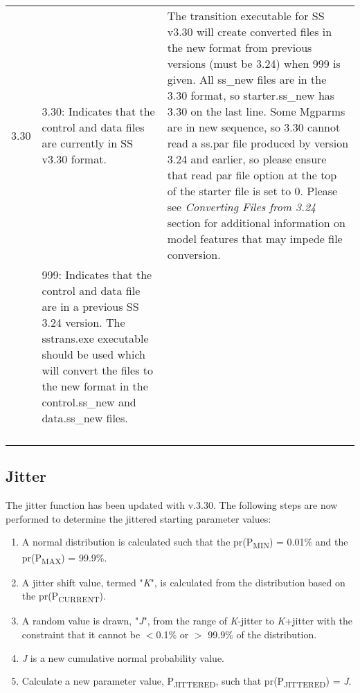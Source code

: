 {\begin{landscape}
\begin{longtable}{p{1.5cm} p{7cm} p{12.5cm}}
 
 \hline
 \hypertarget{Convert}{3.30} & 3.30: Indicates that the control and data files are currently in SS v3.30 format. 
	 & \multirow{1}{1cm}[-0.25cm]{\parbox{12.5cm}{The transition executable for SS v3.30 will create converted files in the new format from previous versions (must be 3.24) when 999 is given.  All ss\_new files are in the 3.30 format, so starter.ss\_new has 3.30 on the last line.  Some Mgparms are in new sequence, so 3.30 cannot read a ss.par file produced by version 3.24 and earlier, so please ensure that read par file option at the top of the starter file is set to 0. Please see \hypertarget{ConvIssues} {\textit{Converting Files from 3.24} section for additional information on model features that may impede file conversion.}}}\Tstrut\\
     & \multirow{1}{1cm}[-0.1cm]{\parbox{7cm}{999: Indicates that the control and data file are in a previous SS 3.24 version.  The sstrans.exe executable should be used which will convert the files to the new format in the control.ss\_new and data.ss\_new files.}}  & \\  
     & & \\  
	   & & \\
     & & \\
   	 & & \\

\end{longtable}
\end{landscape}
}
\restoregeometry

\subsection{Jitter}
\hypertarget{Jitter}{}
The jitter function has been updated with v.3.30.  The following steps are now performed to determine the jittered starting parameter values:
\begin{enumerate}
	\item A normal distribution is calculated such that the pr(P\textsubscript{MIN}) = 0.01\% and the pr(P\textsubscript{MAX}) = 99.9\%.
	\item A jitter shift value, termed "\textit{K}", is calculated from the distribution based on the pr(P\textsubscript{CURRENT}).
	\item A random value is drawn, "\textit{J}", from the range of \textit{K}-jitter to \textit{K}+jitter with the constraint that it cannot be $<$0.1\% or $>$ 99.9\% of the distribution.
	\item \textit{J} is a new cumulative normal probability value.
	\item Calculate a new parameter value, P\textsubscript{JITTERED}, such that pr(P\textsubscript{JITTERED}) = \textit{J}.
\end{enumerate}


